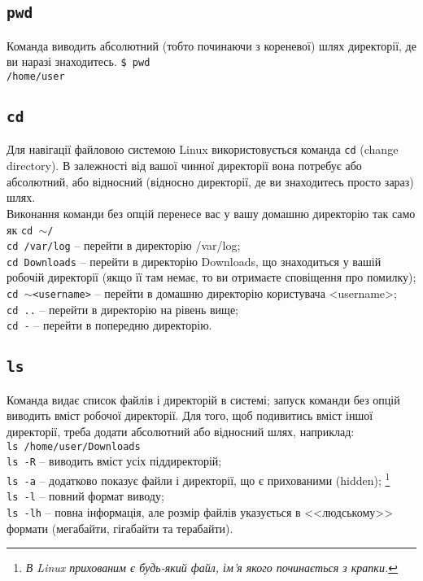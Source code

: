 \documentclass[10pt,a4paper]{fancyhandout}
\begin{document}
\subsection{\texttt{pwd}}
Команда виводить абсолютний (тобто починаючи з кореневої) шлях директорії, де ви наразі знаходитесь.
\texttt{\$ pwd} \\
\texttt{/home/user}
\goodbreak

\subsection{\texttt{cd}}
Для навігації файловою системою Linux використовується команда \texttt{cd} (change directory). В залежності від вашої чинної директорії вона потребує або абсолютний, або відносний (відносно директорії, де ви знаходитесь просто зараз) шлях. \\
Виконання команди без опцій перенесе вас у вашу домашню директорію так само як \texttt{cd $\sim$\slash}\\
\texttt{cd /var/log} -- перейти в директорію /var/log; \\
\texttt{cd Downloads} -- перейти в директорію Downloads, що знаходиться у вашій робочій директорії (якщо її там немає, то ви отримаєте сповіщення про помилку); \\
\texttt{cd $\sim$<username>} -- перейти в домашню директорію користувача <username>; \\
\texttt{cd ..} -- перейти в директорію на рівень вище; \\
\texttt{cd -} -- перейти в попередню директорію.
\goodbreak

\subsection{\texttt{ls}}
Команда видає список файлів і директорій в системі; запуск команди без опцій виводить вміст робочої директорії. Для того, щоб подивитись вміст іншої директорії, треба додати абсолютний або відносний шлях, наприклад: \\
\texttt{ls /home/user/Downloads} \\
\texttt{ls -R} -- виводить вміст усіх піддиректорій; \\
\texttt{ls -a} -- додатково показує файли і директорії, що є прихованими (hidden);
\footnote{\textit{В Linux прихованим є будь-який файл, ім'я якого починається з крапки. }} \\
\texttt{ls -l} -- повний формат виводу; \\
\texttt{ls -lh} -- повна інформація, але розмір файлів указується в <<людському>> формати (мегабайти, гігабайти та терабайти).
\goodbreak
\end{document}

